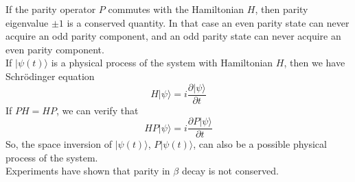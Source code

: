 \noindent
If the parity operator $P$ commutes with the Hamiltonian $H$, then parity eigenvalue $\pm 1$ is a conserved quantity. In that case an even parity state can never acquire an odd parity component, and an odd parity state can never acquire an even parity component. 
\\
If $|\psi(t)\rangle$ is a physical process of the system with Hamiltonian $H$, then we have Schrödinger equation 
\[H|\psi\rangle = i\frac{\partial |\psi\rangle }{\partial t}\]
If $PH = HP$, we can verify that
\[H P|\psi\rangle = i\frac{\partial P |\psi\rangle }{\partial t}\]
So, the space inversion of $|\psi(t)\rangle$, $P|\psi(t)\rangle$, can also be a possible physical process of the system.
\\
Experiments have shown that parity in $\beta$ decay is not conserved.


